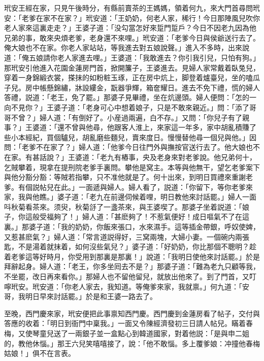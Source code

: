 玳安王經在家，只見午後時分，有縣前賣茶的王媽媽，領着何九，來大門首尋問玳安：「老爹在家不在家？」玳安道：「王奶奶，何老人家，稀行！今日那陣風兒吹你老人家來這裏走走？」王婆子道：「没勾當怎好來踅門踅戶？今日不因老九因為他兄弟的事，敢來央煩老爹，老身還不來哩。」玳安道：「老爹今日與侯爺送行去了。俺大娘也不在家。你老人家站站，等我進去對五娘說聲。」進入不多時，出來說道：「俺五娘請你老人家進去哩。」王婆道：「我敢進去？你引我引兒，只怕有狗。」那玳安引他進入花園金蓮房門首，掀開簾子，王婆進去。見婦人家常戴着臥兔兒，穿着一身錦緞衣裳，搽抹的如粉粧玉琢，正在房中炕上，脚登着爐臺兒，坐的嗑瓜子兒。房中帳懸錦繡，牀設縷金，翫器爭輝，箱奩耀日。進去不免下禮，慌的婦人答禮，説道：「老王，免了罷。」那婆子見畢禮，坐在炕邊頭。婦人便問：「怎的一向不見你？」王婆子道：「老身可心中想着娘子，只是不敢來親近。」問：「添了哥哥不曾？」婦人道：「有倒好了。小産過兩遍，白不存。」又問：「你兒子有了親事？」王婆道：「還不曾與他尋，他跟客人淮上，來家這一年多，家中胡亂積賺了些小本經紀，買個驢兒，胡亂磨些麵兒，賣來度日。慢慢替他尋一個兒與他。」因問：「老爹不在家了？」婦人道：「他爹今日往門外與撫按官送行去了。他大娘也不在家。有甚話說？」王婆道：「老九有樁事，央及老身來對老爹說。他兄弟何十，乞賊攀着，現拿在提刑院老爹手裏問。攀他是窝主。本等與他無干，望乞老爹案下與他分豁分豁：等賊若指攀，只不准他就是了。何十出來，到明日買禮來重謝老爹。有個説帖兒在此。」一面遞與婦人。婦人看了，説道：「你留下，等你老爹來家，我與他瞧。」婆子道：「老九在前邊伺候着哩，明日教他來討話罷。」婦人一面呌秋菊看茶來。须臾，秋菊㧱了一盞茶來，與王婆喫了。那婆子坐着説道：「娘子，你這般受福夠了！」婦人道：「甚麽夠了！不惹氣便好！成日嘔氣不了在這裏。」那婆子道：「我的奶奶，你飯來張口，水來濕手。這等插金帶銀，呼奴使婢，又惹甚麽氣？」婦人道：「常言道説得好，三窝兩塊，大婦小妻。一個碗内兩張匙，不是湯着就抹着，如何沒些氣兒？」婆子道：「好奶奶，你比那個不聰明？趁着老爹這等好時月，你受用到那裏是那裏！」說道：「我明日使他來討話罷。」於是拜辭起身。婦人道：「老王，你多坐囘去不是？」那婆子道：「難為老九只顧等我，不坐罷，改日再來看你。」那婦人也不留他留兒，就放出他來了。到了門首，又叮嚀玳安。玳安道：「你老人家去，我知道。等俺爹來家，我就禀。」何九道：「安哥，我明日早來討話罷。」於是和王婆一路去了。

至晚，西門慶來家，玳安便把此事禀知西門慶。西門慶到金蓮房看了帖子，交付與答應的收着：「明日到衙門中稟我。」一面又令陳經濟發初三日請人帖兒。瞞着春梅，又使琴童兒送了一兩銀子並一盒點心到韓道國家，對着他説：「是與申二姐的，教他休惱。」那王六兒笑嘻嘻接了，說：「他不敢惱。多上覆爹娘：冲撞他春梅姑娘！」俱不在言表。

